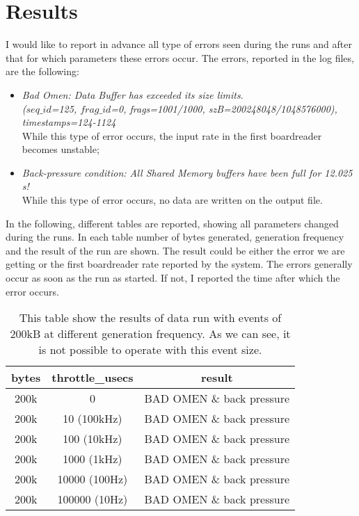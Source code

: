 \documentclass[12pt]{article}
\begin{document}
\section{Results}
I would like to report in advance all type of errors seen during the runs and after that for which parameters these errors occur. The errors, reported in the log files, are the following:
\begin{itemize}
    \item \textit{Bad Omen: Data Buffer has exceeded its size limits}.
    \\
    \textit{($seq\_id$=125, $frag\_id$=0, frags=1001/1000, szB=200248048/1048576000), timestamps=124-1124}
    \\
    While this type of error occurs, the input rate in the first boardreader becomes unstable;
    \item \textit{Back-pressure condition: All Shared Memory buffers have been full for 12.025 s!}
    \\
    While this type of error occurs, no data are written on the output file.
\end{itemize}
In the following, different tables are reported, showing all parameters changed during the runs. In each table number of bytes generated, generation frequency and the result of the run are shown. The result could be either the error we are getting or the first boardreader rate reported by the system. The errors generally occur as soon as the run as started. If not, I reported the time after which the error occurs.
\begin{center}  
\begin{table}[!h]
\centering
\begin{tabular}{c c c}
\hline
bytes & throttle\_usecs &  result\\
\hline
200k & 0 & BAD OMEN \& back pressure \\
200k & 10 (100kHz) & BAD OMEN \& back pressure \\
200k & 100 (10kHz) & BAD OMEN \& back pressure\\
200k & 1000 (1kHz) & BAD OMEN \& back pressure \\
200k & 10000 (100Hz) & BAD OMEN \& back pressure \\
200k & 100000 (10Hz) & BAD OMEN \& back pressure\\
\end{tabular}
\caption{This table show the results of data run with events of 200kB at different generation frequency. As we can see, it is not possible to operate with this event size.}
\end{table}\label{tab:upperlimits}
\end{center}
\end{document}
